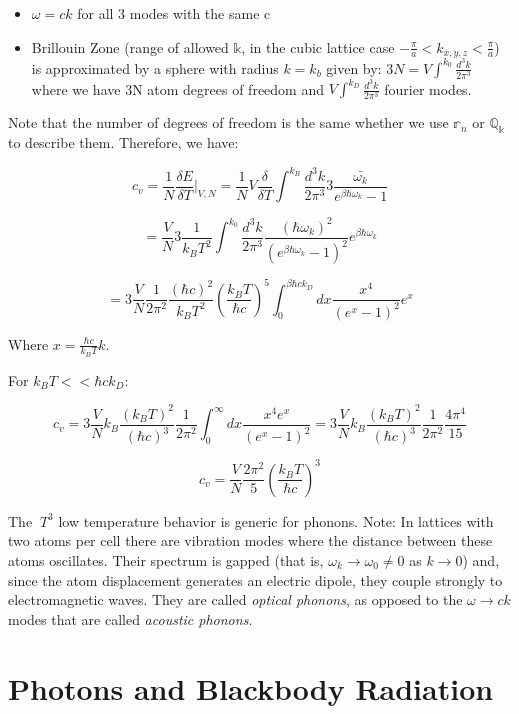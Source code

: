 \documentclass{article}
\newcommand{\thermdif}[4]{\frac{\delta#1}{\delta#2}\vert_{#3,#4}}
\newcommand{\bltz}{k_{B}}
\newcommand{\dtk}{\frac{d^{3}k}{2\pi^{3}}}
\begin{document}
\begin{itemize}
	\item $\omega=ck$ for all 3 modes with the same c
	\item Brillouin Zone (range of allowed $\mathbb{k}$, in the cubic lattice case $-\frac{\pi}{a}<k_{x,y,z}<\frac{\pi}{a}$) is approximated by a sphere with radius $k=k_{b}$ given by: $3N=V\int^{k_0}\dtk$ where we have 3N atom degrees of freedom and $V\int^{k_D}\dtk$ fourier modes.
\end{itemize} 

Note that the number of degrees of freedom is the same whether we use $\mathbb{r}_{n}$ or $\mathbb{Q}_{\mathbb{k}}$ to describe them.  Therefore, we have:

$$c_{v}=\frac{1}{N}\thermdif{E}{T}{V}{N}=\frac{1}{N}V\frac{\delta}{\delta T}\int^{\bltz}\dtk3\frac{\bar{\omega_{k}}}{e^{\beta\hbar\omega_{k}}-1}$$

$$=\frac{V}{N}3\frac{1}{\bltz T^{2}}\int^{k_{0}}\dtk\frac{(\hbar\omega_{k})^{2}}{(e^{\beta\hbar\omega_{k}}-1)^{2}}e^{\beta\hbar\omega_{k}}$$

$$=3\frac{V}{N}\frac{1}{2\pi^{2}}\frac{(\hbar c)^{2}}{\bltz T^{2}}(\frac{\bltz T}{\hbar c})^{5}\int_{0}^{\beta\hbar ck_{D}}dx\frac{x^{4}}{(e^{x}-1)^{2}}e^{x}$$

Where $x=\frac{\hbar c}{\bltz T}k$.  

For $\bltz T << \hbar ck_{D}$:

$$c_{v}=3\frac{V}{N}\bltz\frac{(\bltz T)^{2}}{(\hbar c)^{3}}\frac{1}{2\pi^{2}}\int_{0}^{\infty}dx\frac{x^{4}e^{x}}{(e^{x}-1)^{2}}=3\frac{V}{N}\bltz\frac{(\bltz T)^{2}}{(\hbar c)^{3}}\frac{1}{2\pi^{2}}\frac{4\pi^{4}}{15}$$

$$c_{v}=\frac{V}{N}\frac{2\pi^{2}}{5}(\frac{\bltz T}{\hbar c})^{3}$$

The $~T^{3}$ low temperature behavior is generic for phonons.  Note:  In lattices with two atoms per cell there are vibration modes where the distance between these atoms oscillates.  Their spectrum is gapped (that is, $\omega_{k}\rightarrow\omega_{0}\neq0$ as $k\rightarrow0$) and, since the atom displacement generates an electric dipole, they couple strongly to electromagnetic waves.  They are called \textit{optical phonons}, as opposed to the $\omega\rightarrow ck$ modes that are called \textit{acoustic phonons}.

\section{Photons and Blackbody Radiation}
\end{document}

